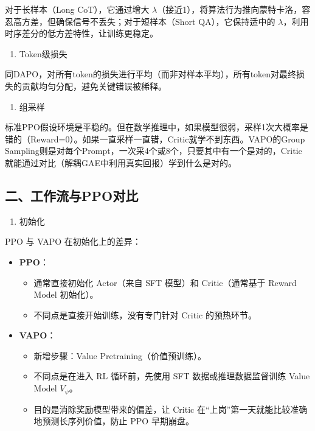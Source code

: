 对于长样本（Long CoT），它通过增大 \(\lambda\)（接近1），将算法行为推向蒙特卡洛，容忍高方差，但确保信号不丢失；对于短样本（Short QA），它保持适中的 \(\lambda\)，利用时序差分的低方差特性，让训练更稳定。

\begin{enumerate}
\def\labelenumi{\arabic{enumi}.}
\setcounter{enumi}{3}
\tightlist
\item
  Token级损失
\end{enumerate}

同DAPO，对所有token的损失进行平均（而非对样本平均），所有token对最终损失的贡献均匀分配，避免关键错误被稀释。

\begin{enumerate}
\def\labelenumi{\arabic{enumi}.}
\setcounter{enumi}{4}
\tightlist
\item
  组采样
\end{enumerate}

标准PPO假设环境是平稳的。但在数学推理中，如果模型很弱，采样1次大概率是错的（Reward=0）。如果一直采样一直错，Critic就学不到东西。VAPO的Group Sampling则是对每个Prompt，一次采4个或8个，只要其中有一个是对的，Critic 就能通过对比（解耦GAE中利用真实回报）学到什么是对的。

\hypertarget{ux4e8cux5de5ux4f5cux6d41ux4e0eppoux5bf9ux6bd4}{%
\subsection{二、工作流与PPO对比}\label{ux4e8cux5de5ux4f5cux6d41ux4e0eppoux5bf9ux6bd4}}

\begin{enumerate}
\def\labelenumi{\arabic{enumi}.}
\tightlist
\item
  初始化
\end{enumerate}

PPO 与 VAPO 在初始化上的差异：

\begin{itemize}
\tightlist
\item
  \textbf{PPO}：

  \begin{itemize}
  \tightlist
  \item
    通常直接初始化 Actor（来自 SFT 模型）和 Critic（通常基于 Reward Model 初始化）。
  \item
    不同点是直接开始训练，没有专门针对 Critic 的预热环节。
  \end{itemize}
\item
  \textbf{VAPO}：

  \begin{itemize}
  \tightlist
  \item
    新增步骤：Value Pretraining（价值预训练）。
  \item
    不同点是在进入 RL 循环前，先使用 SFT 数据或推理数据监督训练 Value Model \(V_\psi\)。
  \item
    目的是消除奖励模型带来的偏差，让 Critic 在``上岗''第一天就能比较准确地预测长序列价值，防止 PPO 早期崩盘。
  \end{itemize}
\end{itemize}

